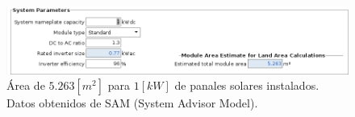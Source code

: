 \begin{figure}[h] \centering
	\centering
	\includegraphics[width=1\textwidth]{./capitulos/resultados_discusion/images/solar_panel_area.png}
	\caption{Área de $5.263[m^2]$ para $1[kW]$ de panales solares instalados. Datos obtenidos de SAM (System Advisor Model).}
	\label{fig:solar_panel_area}
\end{figure}
